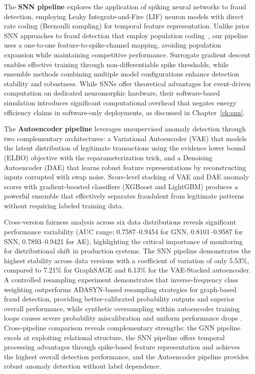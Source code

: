 The \textbf{SNN pipeline} explores the application of spiking neural networks to fraud detection, employing Leaky Integrate-and-Fire (LIF) neuron models with direct rate coding (Bernoulli sampling) for temporal feature representation. Unlike prior SNN approaches to fraud detection that employ population coding~\cite{farahat2025objective}, our pipeline uses a one-to-one feature-to-spike-channel mapping, avoiding population expansion while maintaining competitive performance. Surrogate gradient descent enables effective training through non-differentiable spike thresholds, while ensemble methods combining multiple model configurations enhance detection stability and robustness. While SNNs offer theoretical advantages for event-driven computation on dedicated neuromorphic hardware, their software-based simulation introduces significant computational overhead that negates energy efficiency claims in software-only deployments, as discussed in Chapter~\ref{ch:snn}.

The \textbf{Autoencoder pipeline} leverages unsupervised anomaly detection through two complementary architectures: a Variational Autoencoder (VAE) that models the latent distribution of legitimate transactions using the evidence lower bound (ELBO) objective with the reparameterization trick, and a Denoising Autoencoder (DAE) that learns robust feature representations by reconstructing inputs corrupted with swap noise. Score-level stacking of VAE and DAE anomaly scores with gradient-boosted classifiers (XGBoost and LightGBM) produces a powerful ensemble that effectively separates fraudulent from legitimate patterns without requiring labeled training data.

Cross-version fairness analysis across six data distributions reveals significant performance variability (AUC range: 0.7587--0.9454 for GNN, 0.8101--0.9587 for SNN, 0.7893--0.9421 for AE), highlighting the critical importance of monitoring for distributional shift in production systems. The SNN pipeline demonstrates the highest stability across data versions with a coefficient of variation of only 5.53\%, compared to 7.21\% for GraphSAGE and 6.13\% for the VAE-Stacked autoencoder. A controlled resampling experiment demonstrates that inverse-frequency class weighting outperforms ADASYN-based resampling strategies for graph-based fraud detection, providing better-calibrated probability outputs and superior overall performance, while synthetic oversampling within autoencoder training loops causes severe probability miscalibration and uniform performance drops \cite{dong2025enhanced}. Cross-pipeline comparison reveals complementary strengths: the GNN pipeline excels at exploiting relational structure, the SNN pipeline offers temporal processing advantages through spike-based feature representation and achieves the highest overall detection performance, and the Autoencoder pipeline provides robust anomaly detection without label dependence.

